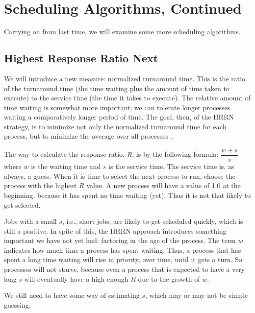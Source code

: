 




\section*{Scheduling Algorithms, Continued}

Carrying on from last time, we will examine some more scheduling algorithms.

\subsection*{Highest Response Ratio Next}

We will introduce a new measure: normalized turnaround time. This is the ratio of the turnaround time (the time waiting plus the amount of time taken to execute) to the service time (the time it takes to execute). The relative amount of time waiting is somewhat more important; we can tolerate longer processes waiting a comparatively longer period of time. The goal, then, of the HRRN strategy, is to minimize not only the normalized turnaround time for each process, but to minimize the average over all processes~\cite{osi}.

The way to calculate the response ratio, $R$, is by the following formula: $\dfrac{w + s}{s}$ where $w$ is the waiting time and $s$ is the service time. The service time is, as always, a guess. When it is time to select the next process to run, choose the process with the highest $R$ value. A new process will have a value of 1.0 at the beginning, because it has spent no time waiting (yet). Thus it is not that likely to get selected.

Jobs with a small $s$, i.e., short jobs, are likely to get scheduled quickly, which is still a positive. In spite of this, the HRRN approach introduces something important we have not yet had: factoring in the age of the process. The term $w$ indicates how much time a process has spent waiting. Thus, a process that has spent a long time waiting will rise in priority, over time, until it gets a turn. So processes will not starve, because even a process that is expected to have a very long $s$ will eventually have a high enough $R$ due to the growth of $w$.

We still need to have some way of estimating $s$, which may or may not be simple guessing. 

